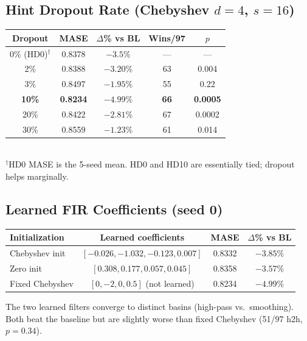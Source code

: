 \documentclass{article}
\begin{document}
\subsection{Hint Dropout Rate (Chebyshev $d=4$, $s=16$)}

\begin{table}[h]
\centering
\small
\begin{tabular}{ccccc}
\toprule
\textbf{Dropout} & \textbf{MASE} & \textbf{$\Delta$\% vs BL} & \textbf{Wins/97} & \textbf{$p$} \\
\midrule
0\% (HD0)$^\dagger$ & 0.8378 & $-3.5\%$ & --- & --- \\
2\% & 0.8388 & $-3.20\%$ & 63 & 0.004 \\
3\% & 0.8497 & $-1.95\%$ & 55 & 0.22 \\
\textbf{10\%} & \textbf{0.8234} & $\mathbf{-4.99\%}$ & \textbf{66} & \textbf{0.0005} \\
20\% & 0.8422 & $-2.81\%$ & 67 & 0.0002 \\
30\% & 0.8559 & $-1.23\%$ & 61 & 0.014 \\
\bottomrule
\end{tabular}
\\[2pt]
{\footnotesize $^\dagger$HD0 MASE is the 5-seed mean. HD0 and HD10 are essentially tied; dropout helps marginally.}
\end{table}

\subsection{Learned FIR Coefficients (seed 0)}

\begin{table}[h]
\centering
\small
\begin{tabular}{lccc}
\toprule
\textbf{Initialization} & \textbf{Learned coefficients} & \textbf{MASE} & \textbf{$\Delta$\% vs BL} \\
\midrule
Chebyshev init & $[-0.026, -1.032, -0.123, 0.007]$ & 0.8332 & $-3.85\%$ \\
Zero init & $[0.308, 0.177, 0.057, 0.045]$ & 0.8358 & $-3.57\%$ \\
Fixed Chebyshev & $[0, -2, 0, 0.5]$ (not learned) & 0.8234 & $-4.99\%$ \\
\bottomrule
\end{tabular}
\end{table}

The two learned filters converge to distinct basins (high-pass vs.\ smoothing). Both beat the baseline but are slightly worse than fixed Chebyshev (51/97 h2h, $p=0.34$).
\end{document}
